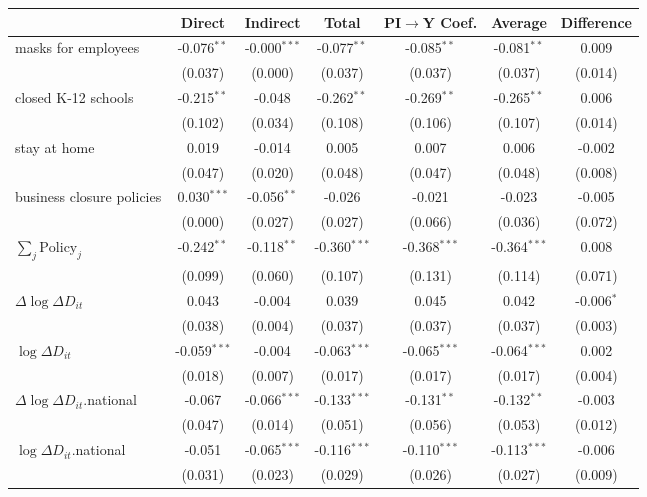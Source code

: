
\begin{tabular}{lccccc|>{}c}
\toprule
  & Direct & Indirect & Total & PI$\to$Y Coef. & Average & Difference\\
\midrule
masks for employees & -0.076$^{**}$ & -0.000$^{***}$ & -0.077$^{**}$ & -0.085$^{**}$ & -0.081$^{**}$ & 0.009\\
 & (0.037) & (0.000) & (0.037) & (0.037) & (0.037) & (0.014)\\
closed K-12 schools & -0.215$^{**}$ & -0.048 & -0.262$^{**}$ & -0.269$^{**}$ & -0.265$^{**}$ & 0.006\\
 & (0.102) & (0.034) & (0.108) & (0.106) & (0.107) & (0.014)\\
stay at home & 0.019 & -0.014 & 0.005 & 0.007 & 0.006 & -0.002\\
 & (0.047) & (0.020) & (0.048) & (0.047) & (0.048) & (0.008)\\
business closure policies & 0.030$^{***}$ & -0.056$^{**}$ & -0.026 & -0.021 & -0.023 & -0.005\\
 & (0.000) & (0.027) & (0.027) & (0.066) & (0.036) & (0.072)\\
$\sum_j \mathrm{Policy}_j$ & -0.242$^{**}$ & -0.118$^{**}$ & -0.360$^{***}$ & -0.368$^{***}$ & -0.364$^{***}$ & 0.008\\
 & (0.099) & (0.060) & (0.107) & (0.131) & (0.114) & (0.071)\\
$\Delta \log \Delta D_{it}$ & 0.043 & -0.004 & 0.039 & 0.045 & 0.042 & -0.006$^{*}$\\
 & (0.038) & (0.004) & (0.037) & (0.037) & (0.037) & (0.003)\\
$\log \Delta D_{it}$ & -0.059$^{***}$ & -0.004 & -0.063$^{***}$ & -0.065$^{***}$ & -0.064$^{***}$ & 0.002\\
 & (0.018) & (0.007) & (0.017) & (0.017) & (0.017) & (0.004)\\
$\Delta \log \Delta D_{it}$.national & -0.067 & -0.066$^{***}$ & -0.133$^{***}$ & -0.131$^{**}$ & -0.132$^{**}$ & -0.003\\
 & (0.047) & (0.014) & (0.051) & (0.056) & (0.053) & (0.012)\\
$\log \Delta D_{it}$.national & -0.051 & -0.065$^{***}$ & -0.116$^{***}$ & -0.110$^{***}$ & -0.113$^{***}$ & -0.006\\
 & (0.031) & (0.023) & (0.029) & (0.026) & (0.027) & (0.009)\\
\bottomrule
\end{tabular}